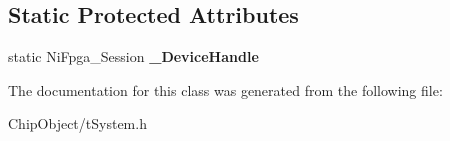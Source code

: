 \subsection*{Static Protected Attributes}
\begin{DoxyCompactItemize}
\item 
\hypertarget{classnFPGA_1_1tSystem_afb41b1612083b63400ecfae9cffd281f}{
static NiFpga\_\-Session {\bfseries \_\-DeviceHandle}}
\label{classnFPGA_1_1tSystem_afb41b1612083b63400ecfae9cffd281f}

\end{DoxyCompactItemize}


The documentation for this class was generated from the following file:\begin{DoxyCompactItemize}
\item 
ChipObject/tSystem.h\end{DoxyCompactItemize}
